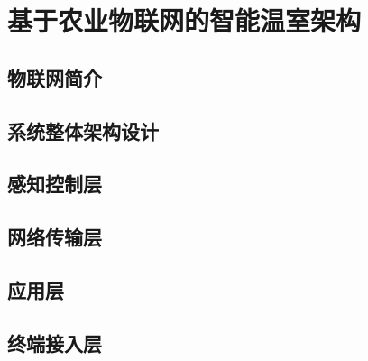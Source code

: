 
\chapter{基于农业物联网的智能温室架构}
\label{chapter:IoT Architecture}

\section{物联网简介}

\section{系统整体架构设计}

\section{感知控制层}

\section{网络传输层}

\section{应用层}

\section{终端接入层}
 

